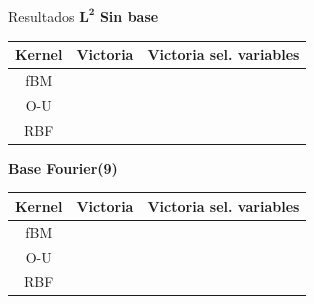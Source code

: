 \documentclass[10pt, spanish, professionalfonts]{beamer}
\newcommand{\cmark}{\ding{51}}%
\newcommand{\xmark}{\ding{55}}%
\begin{document}
\begin{frame}{Resultados \(\boldsymbol{L^2}\)}
\textbf{Sin base}
  \begin{table}
    \begin{tabular}{c|cc}
      Kernel & Victoria & Victoria sel. variables \\ \hline
      fBM & \xmark & \xmark\\
      O-U & \cmark & \xmark\\
      RBF & \cmark & \cmark
    \end{tabular}
  \end{table}

  \textbf{Base Fourier(9)}
  \begin{table}
    \begin{tabular}{c|cc}
      Kernel & Victoria & Victoria sel. variables \\ \hline
      fBM & \xmark &  \cmark\\
      O-U & \xmark & \cmark\\
      RBF & \cmark & \cmark
    \end{tabular}
  \end{table}
\end{frame}
\end{document}
